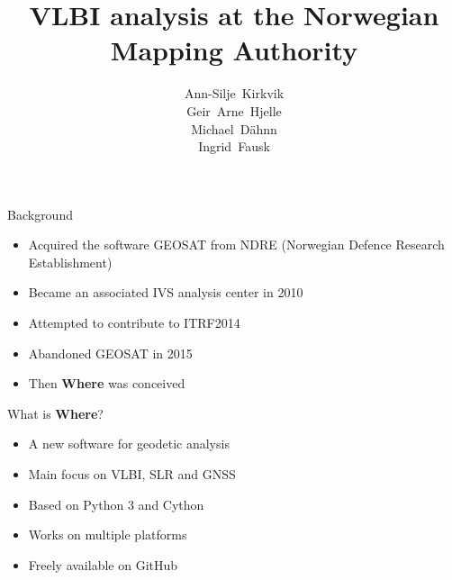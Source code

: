 \documentclass[14pt,c]{beamer}
\title{VLBI analysis at the Norwegian Mapping Authority}
\author{Ann-Silje~Kirkvik \\ Geir~Arne~Hjelle \\ Michael~D\"ahnn \\ Ingrid~Fausk}
\begin{document}
{
    \frame[plain,t]{\titlepage}
}

\begin{frame}{Background}
  \begin{itemize}
  \item Acquired the software GEOSAT from NDRE (Norwegian Defence Research Establishment) 
  \item Became an associated IVS analysis center in 2010
  \item Attempted to contribute to ITRF2014
  \item Abandoned GEOSAT in 2015
  \item Then \textbf{Where} was conceived 
  \end{itemize}
\end{frame}

\begin{frame}{What is \textbf{Where}?}
\begin{itemize}
  \item A new software for geodetic analysis
  \item Main focus on VLBI, SLR and GNSS
  \item Based on Python 3 and Cython
  \item Works on multiple platforms
  \item Freely available on GitHub
\end{itemize}
\end{frame}
\end{document}

